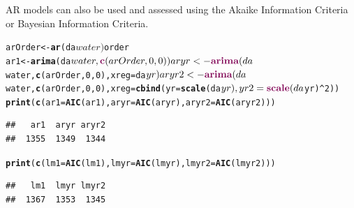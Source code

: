 \documentclass{article}\usepackage{graphicx, color}
\makeatletter
\newcommand{\hlfunctioncall}[1]{\textcolor[rgb]{0.501960784313725,0,0.329411764705882}{\textbf{#1}}}%
\newenvironment{kframe}{%
 \def\at@end@of@kframe{}%
 \ifinner\ifhmode%
  \def\at@end@of@kframe{\end{minipage}}%
  \begin{minipage}{\columnwidth}%
 \fi\fi%
 \def\FrameCommand##1{\hskip\@totalleftmargin \hskip-\fboxsep
 \colorbox{shadecolor}{##1}\hskip-\fboxsep
     \hskip-\linewidth \hskip-\@totalleftmargin \hskip\columnwidth}%
 \MakeFramed {\advance\hsize-\width
   \@totalleftmargin\z@ \linewidth\hsize
   \@setminipage}}%
 {\par\unskip\endMakeFramed%
 \at@end@of@kframe}
\newenvironment{knitrout}{}{} %
\makeatother
\begin{document}
AR models can also be used and assessed using the Akaike Information Criteria or Bayesian Information Criteria. 
\begin{knitrout}
\color{fgcolor}\begin{kframe}
\begin{alltt}
arOrder <- \hlfunctioncall{ar}(da$water)$order
ar1 <- \hlfunctioncall{arima}(da$water, \hlfunctioncall{c}(arOrder, 0, 0))
aryr <- \hlfunctioncall{arima}(da$water, \hlfunctioncall{c}(arOrder, 0, 0), xreg = da$yr)
aryr2 <- \hlfunctioncall{arima}(da$water, \hlfunctioncall{c}(arOrder, 0, 0), xreg = \hlfunctioncall{cbind}(yr = \hlfunctioncall{scale}(da$yr), yr2 = \hlfunctioncall{scale}(da$yr)^2))
\hlfunctioncall{print}(\hlfunctioncall{c}(ar1 = \hlfunctioncall{AIC}(ar1), aryr = \hlfunctioncall{AIC}(aryr), aryr2 = \hlfunctioncall{AIC}(aryr2)))
\end{alltt}
\begin{verbatim}
##   ar1  aryr aryr2 
##  1355  1349  1344
\end{verbatim}
\begin{alltt}
\hlfunctioncall{print}(\hlfunctioncall{c}(lm1 = \hlfunctioncall{AIC}(lm1), lmyr = \hlfunctioncall{AIC}(lmyr), lmyr2 = \hlfunctioncall{AIC}(lmyr2)))
\end{alltt}
\begin{verbatim}
##   lm1  lmyr lmyr2 
##  1367  1353  1345
\end{verbatim}
\end{kframe}
\end{knitrout}
\end{document}
